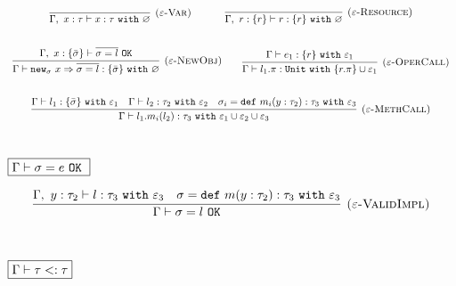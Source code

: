 \documentclass{llncs}
\newcommand{\keywadj}[1]{\mathtt{#1}}
\newcommand{\keyw}[1]{\keywadj{#1}~}
\newcommand{\type}[2]{
	#1~\keyw{with} #2
}
\newcommand{\newsig}[0]{
	\keywadj{new}_\sigma~x \Rightarrow \overline{\sigma = l}
}
\begin{document}
\noindent
\fbox{$\Gamma \vdash l : \tau~\keyw{with} \varepsilon$}

\[
\begin{array}{c}
	\infer[\textsc{($\varepsilon$-Var)}]
  {\Gamma,~x:\tau \vdash x: \type{\tau}{\varnothing} }
  {} 
~~~~~~~~~~
\infer[\textsc{($\varepsilon$-Resource)}]
  {\Gamma,~r :\{ r\} \vdash r: \type{   \{ r \}  }{\varnothing}}
  {} \\[5ex]

\infer[\textsc{($\varepsilon$-NewObj)}]
	{\Gamma \vdash \newsig : \{ \bar \sigma \}~\keyw{with} \varnothing}
	{\Gamma,~x : \{ \bar \sigma \} \vdash \overline{\sigma = l}~\keywadj{OK}} ~~~~~~

\infer[\textsc{($\varepsilon$-OperCall)}]
	{\Gamma \vdash l_1.\pi : \keyw{Unit} \keyw{with} \{ r.\pi \} \cup \varepsilon_1}
	{\Gamma \vdash e_1 : \{ r \}~ \keyw{with} \varepsilon_1} \\[5ex]
	
\infer[\textsc{($\varepsilon$-MethCall)}]
	{\Gamma \vdash l_1.m_i(l_2):\tau_3~\keyw{with} \varepsilon_1 \cup \varepsilon_2 \cup \varepsilon_3}
	{\Gamma \vdash l_1 : \{ \bar \sigma \}~\keyw{with} \varepsilon_1 & \Gamma \vdash l_2 : \tau_2~\keyw{with} \varepsilon_2 & \sigma_i = \keyw{def} m_i(y:\tau_2):\tau_3~\keyw{with} \varepsilon_3} \\[5ex]
\end{array}
\]

\noindent
$\fbox{$\Gamma \vdash \sigma = e~\keyw{OK}$}$

\[
\begin{array}{c}
\infer[\textsc{($\varepsilon$-ValidImpl)}]
	{\Gamma \vdash \sigma = l~\keywadj{OK}}
	{\Gamma,~y:\tau_2 \vdash l: \tau_3~\keyw{with} \varepsilon_3 & \sigma = \keyw{def} m(y:\tau_2):\tau_3~\keyw{with} \varepsilon_3} \\[5ex]
\end{array}
\]



\noindent
$\fbox{$\Gamma \vdash \tau <: \tau$}$
\end{document}
